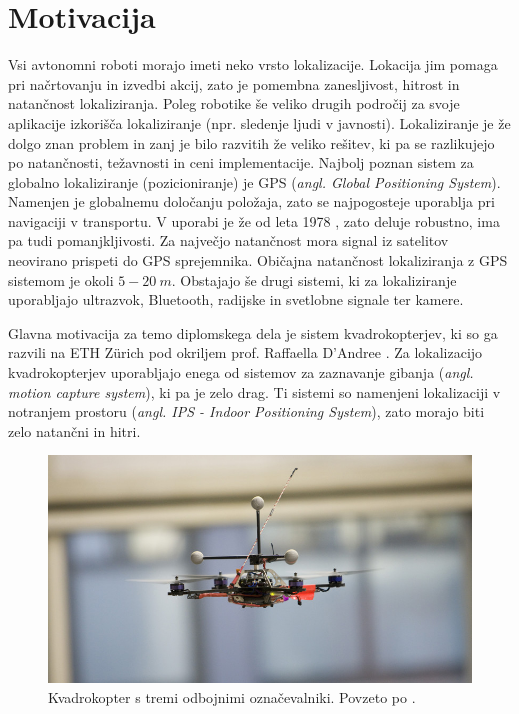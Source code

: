 \documentclass[a4paper, 12pt]{book}
\begin{document}
\section{Motivacija}
Vsi avtonomni roboti morajo imeti neko vrsto lokalizacije. Lokacija jim pomaga pri načrtovanju in izvedbi akcij, zato je pomembna zanesljivost, hitrost in natančnost lokaliziranja. Poleg robotike še veliko drugih področij za svoje aplikacije izkorišča lokaliziranje (npr. sledenje ljudi v javnosti).
Lokaliziranje je že dolgo znan problem in zanj je bilo razvitih že veliko rešitev, ki pa se razlikujejo po natančnosti, težavnosti in ceni implementacije. Najbolj poznan sistem za globalno lokaliziranje (pozicioniranje) je GPS (\emph{angl. Global Positioning System}). Namenjen je globalnemu določanju položaja, zato se najpogosteje uporablja pri navigaciji v transportu. V uporabi je že od leta 1978 \cite{wiki:gps}, zato deluje robustno, ima pa tudi pomanjkljivosti. Za največjo natančnost mora signal iz satelitov neovirano prispeti do GPS sprejemnika. Običajna natančnost lokaliziranja z GPS sistemom je okoli $5-20 \ m$. Obstajajo še drugi sistemi, ki za lokaliziranje uporabljajo ultrazvok, Bluetooth, radijske in svetlobne signale ter kamere.

Glavna motivacija za temo diplomskega dela je sistem kvadrokopterjev, ki so ga razvili na ETH Zürich pod okriljem prof. Raffaella D’Andree \cite{fma}. Za lokalizacijo kvadrokopterjev uporabljajo enega od sistemov za zaznavanje gibanja (\emph{angl. motion capture system}), ki pa je zelo drag. Ti sistemi so namenjeni lokalizaciji v notranjem prostoru (\emph{angl. IPS - Indoor Positioning System}), zato morajo biti zelo natančni in hitri. 

\begin{figure}[H]
\centering
\includegraphics[width=\textwidth,height=\textheight,keepaspectratio]{flying_machine_arena.jpg}
\caption{Kvadrokopter s tremi odbojnimi označevalniki. Povzeto po \cite{fma}.}
\end{figure}
\end{document}
